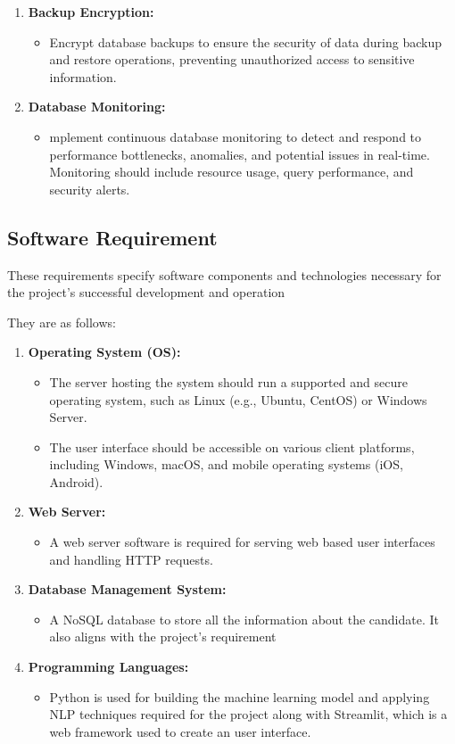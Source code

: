 \begin{enumerate}
    \item \textbf{Backup Encryption:}
		\begin{itemize}
			\item Encrypt database backups to ensure the security of data during backup and restore operations, preventing unauthorized access to sensitive information.
		\end{itemize}
    \item \textbf{Database Monitoring:}
		\begin{itemize}
			\item mplement continuous database monitoring to detect and respond to performance bottlenecks, anomalies, and potential issues in real-time. Monitoring should include resource usage, query performance, and security alerts.
		\end{itemize}
\end{enumerate}


\subsection{Software Requirement}
These requirements specify software components and technologies necessary for the project's successful development and operation

They are as follows:

\begin{enumerate}
    \item \textbf{Operating System (OS):}
		\begin{itemize}
			\item The server hosting the system should run a supported and secure operating system, such as Linux (e.g., Ubuntu, CentOS) or Windows Server.
			\item The user interface should be accessible on various client platforms, including Windows, macOS, and mobile operating systems (iOS, Android).
		\end{itemize}
    \item \textbf{Web Server:}
		\begin{itemize}
			\item A web server software is required for serving web based user interfaces and handling HTTP requests.
		\end{itemize}
    \item \textbf{Database Management System:}
		\begin{itemize}
			\item A NoSQL database to store all the information about the candidate. It also aligns with the project's requirement
		\end{itemize}
    \item \textbf{Programming Languages:}
		\begin{itemize}
			\item Python is used for building the machine learning model and applying NLP techniques required for the project along with Streamlit, which is a web framework used to create an user interface.
		\end{itemize}
\end{enumerate}


